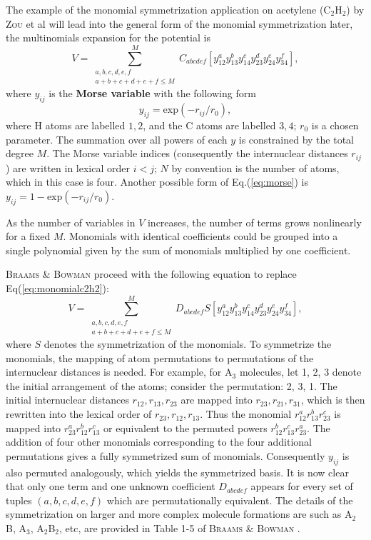 \documentclass[12pt]{article}
\begin{document}
The example of the monomial symmetrization application on acetylene (C$_2$H$_2$) by \textsc{Zou} et al \cite{idx177} will lead into the general form of the monomial symmetrization later, the multinomials expansion for the potential is
\begin{equation}
    V = \sum^M_{\substack{a,b,c,d,e,f \\ a+b+c+d+e+f \leq M}}C_{abcdef}\left[y_{12}^a y_{13}^b y_{14}^c y_{23}^d y_{24}^e y_{34}^f\right],
    \label{eq:monomialc2h2}
\end{equation}
where $y_{ij}$ is the \textbf{Morse variable} with the following form
\begin{equation}
    y_{ij} = \text{exp}(-r_{ij}/r_0),
    \label{eq:morse}
\end{equation}
where H atoms are labelled $1,2$, and the C atoms are labelled $3, 4$; $r_0$ is a chosen parameter. The summation over all powers of each $y$ is constrained by the total degree $M$. The Morse variable indices (consequently the internuclear distances $r_{ij}$) are written in lexical order $i<j$; $N$ by convention is the number of atoms, which in this case is four. Another possible form of Eq.(\ref{eq:morse}) is $y_{ij} = 1-\text{exp}(-r_{ij}/r_0)$.

As the number of variables in $V$ increases, the number of terms grows nonlinearly for a fixed $M$. Monomials with identical coefficients could be grouped into a single polynomial given by the sum of monomials multiplied by one coefficient.

\textsc{Braams \& Bowman} \cite{idx176} proceed with the following equation to replace Eq(\ref{eq:monomialc2h2}):
\begin{equation}
    V = \sum_{\substack{a,b,c,d,e,f \\ a+b+c+d+e+f \leq M}}^MD_{abcdef}S\left[y_{12}^a y_{13}^b y_{14}^c y_{23}^d y_{24}^e y_{34}^f\right],
    \label{eq:monomialgeneral}
\end{equation}
where $S$ denotes the symmetrization of the monomials. To symmetrize the monomials, the mapping of atom permutations to permutations of the internuclear distances is needed. For example, for A$_3$ molecules, let 1, 2, 3 denote the initial arrangement of the atoms; consider the permutation: 2, 3, 1. The initial internuclear distances $r_{12}, r_{13}, r_{23}$ are mapped into $r_{23}, r_{21}, r_{31}$, which is then rewritten into the lexical order of $r_{23}, r_{12}, r_{13}$. Thus the monomial $r_{12}^ar_{13}^br_{23}^c$ is mapped into $r_{23}^ar_{12}^br_{13}^c$ or equivalent to the permuted powers $r_{12}^br_{13}^cr_{23}^a$. The addition of four other monomials corresponding to the four additional permutations gives a fully symmetrized sum of monomials. Consequently $y_{ij}$ is also permuted analogously, which yields the symmetrized basis. It is now clear that only one term and one unknown coefficient $D_{abcdef}$ appears for every set of tuples $(a,b,c,d,e,f)$ which are permutationally equivalent. The details of the symmetrization on larger and more complex molecule formations are such as A$_2$B, A$_3$, A$_2$B$_2$, etc, are provided in Table 1-5 of \textsc{Braams \& Bowman} \cite{idx176}.
\end{document}
